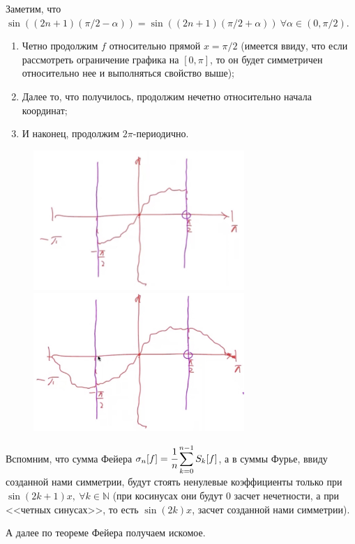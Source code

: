 \begin{solution}
    Заметим, что $\sin{\left((2n + 1) (\pi / 2 - \alpha)\right)} = \sin{\left((2n + 1) (\pi / 2 + \alpha)\right)} \ \forall \alpha \in (0, \pi / 2)$.
    \begin{enumerate}
        \item Четно продолжим $f$ относительно прямой $x = \pi / 2$ (имеется ввиду, что если рассмотреть ограничение графика на $[0, \pi]$, то он будет симметричен относительно нее и выполняться свойство выше);
        \item Далее то, что получилось, продолжим нечетно относительно начала координат;
        \item И наконец, продолжим $2\pi$-периодично.
    \end{enumerate}
    \begin{figure}[h!]
\begin{center}
    \begin{minipage}[h]{0.45\linewidth}
    \centering
    \includegraphics[width=8cm]{Pictures/sem6_1.jpeg}
    \end{minipage}
    \hfill
    \begin{minipage}[h]{0.45\linewidth}
    \begin{center}
        \includegraphics[width=8cm]{Pictures/sem6_2.jpeg}
    \end{center}
    \end{minipage}
    \hfill

\end{center}
\end{figure}
    Вспомним, что сумма Фейера $\displaystyle \sigma_n [f] = \cfrac{1}{n} \sum_{k = 0}^{n - 1} S_k [f]$, а в суммы Фурье, ввиду созданной нами симметрии, будут стоять ненулевые коэффициенты только при $\sin{(2k + 1) x}, \ \forall k \in \mathbb{N}$ (при косинусах они будут 0 засчет нечетности, а при <<четных синусах>>, то есть $\sin{(2k)x}$, засчет созданной нами симметрии).

    А далее по теореме Фейера получаем искомое.
\end{solution}

